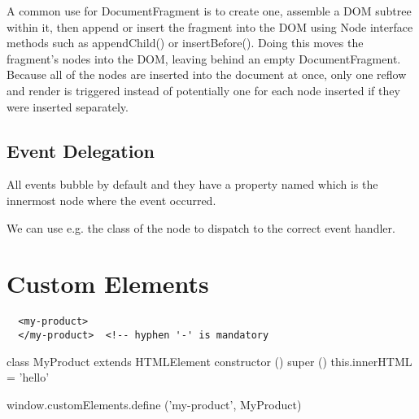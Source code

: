 A common use for DocumentFragment is to create one, assemble a DOM subtree
within it, then append or insert the fragment into the DOM using Node
interface methods such as appendChild() or insertBefore(). Doing this moves
the fragment's nodes into the DOM, leaving behind an empty
DocumentFragment. Because all of the nodes are inserted into the document at
once, only one reflow and render is triggered instead of potentially one for
each node inserted if they were inserted separately.


\subsection{Event Delegation}

All events bubble by default and they have a property named 
which is the innermost node where the event occurred.

We can use e.g. the class  of the node to dispatch to the correct
event handler.



\section{Custom Elements}

{\small
\begin{verbatim}
  <my-product>
  </my-product>  <!-- hyphen '-' is mandatory
\end{verbatim}
}

\begin{js}
  class MyProduct extends HTMLElement {
    constructor () {
      super ()
      this.innerHTML = 'hello'
    }
  }

  window.customElements.define ('my-product', MyProduct)
\end{js}

